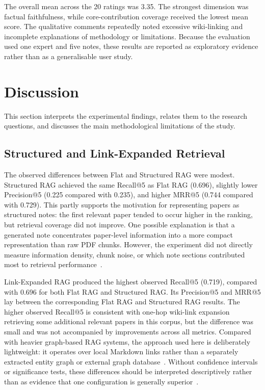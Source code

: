 \documentclass[runningheads]{llncs}
\begin{document}
The overall mean across the 20 ratings was 3.35. The strongest dimension
was factual faithfulness, while core-contribution coverage received the
lowest mean score. The qualitative comments repeatedly noted excessive
wiki-linking and incomplete explanations of methodology or limitations.
Because the evaluation used one expert and five notes, these results are
reported as exploratory evidence rather than as a generalisable user
study.

\section{Discussion}
\label{sec:discussion}

This section interprets the experimental findings, relates them to the
research questions, and discusses the main methodological limitations of
the study.

\subsection{Structured and Link-Expanded Retrieval}

The observed differences between Flat and Structured RAG were modest. Structured RAG achieved the
same Recall@5 as Flat RAG (0.696), slightly lower Precision@5 (0.225
compared with 0.235), and higher MRR@5 (0.744 compared with 0.729).
This partly supports the motivation for representing papers as
structured notes: the first relevant paper tended to occur higher in the
ranking, but retrieval coverage did not improve. One possible
explanation is that a generated note concentrates paper-level
information into a more compact representation than raw PDF chunks.
However, the experiment did not directly measure information density,
chunk noise, or which note sections contributed most to retrieval
performance~\cite{lewis2020retrieval,sarthi2024raptor}.

Link-Expanded RAG produced the highest observed Recall@5 (0.719),
compared with 0.696 for both Flat RAG and Structured RAG. Its
Precision@5 and MRR@5 lay between the corresponding Flat RAG and
Structured RAG results. The higher observed Recall@5 is consistent with one-hop wiki-link
expansion retrieving some additional relevant papers in this corpus,
but the difference was small and was not accompanied by improvements
across all metrics. Compared with heavier graph-based
RAG systems, the approach used here is deliberately lightweight: it
operates over local Markdown links rather than a separately extracted
entity graph or external graph database~\cite{edge2024local,gutierrez2024hipporag}.
Without confidence intervals or significance tests, these differences
should be interpreted descriptively rather than as evidence that one
configuration is generally superior~\cite{urbano2019statistical}.
\end{document}
